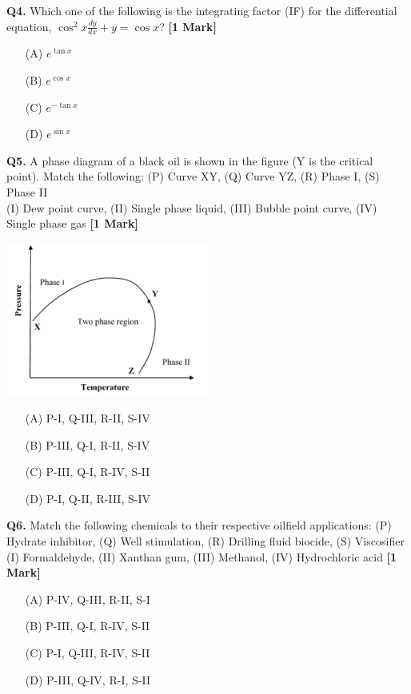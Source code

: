 \documentclass[11pt]{article}
\newcommand{\questiona}[2]{
    \noindent\textbf{Q#2.} #1 \hfill \textbf{[1 Mark]}
}
\begin{document}
\questiona{Which one of the following is the integrating factor (IF) for the differential equation, \( \cos^2 x \frac{dy}{dx} + y = \cos x \)?}{4}
\begin{enumerate}
    \item[(A)] \( e^{\tan x} \)  
    \item[(B)] \( e^{\cos x} \)  
    \item[(C)] \( e^{-\tan x} \)  
    \item[(D)] \( e^{\sin x} \)  
\end{enumerate}
\vspace{0.5cm}

\questiona{A phase diagram of a black oil is shown in the figure (Y is the critical point). Match the following: (P) Curve XY, (Q) Curve YZ, (R) Phase I, (S) Phase II \\ (I) Dew point curve, (II) Single phase liquid, (III) Bubble point curve, (IV) Single phase gas}{5}
\begin{center}
\includegraphics[width=0.5\textwidth]{figures/5.png}
\end{center}
\begin{enumerate}
    \item[(A)] P-I, Q-III, R-II, S-IV  
    \item[(B)] P-III, Q-I, R-II, S-IV  
    \item[(C)] P-III, Q-I, R-IV, S-II  
    \item[(D)] P-I, Q-II, R-III, S-IV  
\end{enumerate}
\vspace{0.5cm}

\questiona{Match the following chemicals to their respective oilfield applications: (P) Hydrate inhibitor, (Q) Well stimulation, (R) Drilling fluid biocide, (S) Viscosifier \\ (I) Formaldehyde, (II) Xanthan gum, (III) Methanol, (IV) Hydrochloric acid}{6}
\begin{enumerate}
    \item[(A)] P-IV, Q-III, R-II, S-I  
    \item[(B)] P-III, Q-I, R-IV, S-II  
    \item[(C)] P-I, Q-III, R-IV, S-II  
    \item[(D)] P-III, Q-IV, R-I, S-II  
\end{enumerate}
\vspace{0.5cm}
\end{document}
